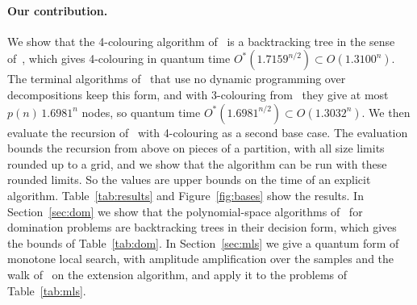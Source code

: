 \documentclass[11pt]{article}
\theoremstyle{remark}
\begin{document}
\paragraph{Our contribution.} We show that the 4-colouring algorithm of~\cite{WGJ24} is a backtracking tree in the sense of~\cite{Mon18}, which gives 4-colouring in quantum time $O^*(1.7159^{n/2}) \subset O(1.3100^n)$. The terminal algorithms of~\cite{YS26} that use no dynamic programming over decompositions keep this form, and with 3-colouring from~\cite{BE05} they give at most $p(n)\,1.6981^n$ nodes, so quantum time $O^*(1.6981^{n/2}) \subset O(1.3032^n)$. We then evaluate the recursion of~\cite{SM22} with 4-colouring as a second base case. The evaluation bounds the recursion from above on pieces of a partition, with all size limits rounded up to a grid, and we show that the algorithm can be run with these rounded limits. So the values are upper bounds on the time of an explicit algorithm. Table~\ref{tab:results} and Figure~\ref{fig:bases} show the results. In Section~\ref{sec:dom} we show that the polynomial-space algorithms of~\cite{RB11,RB12,BEP10} for domination problems are backtracking trees in their decision form, which gives the bounds of Table~\ref{tab:dom}. In Section~\ref{sec:mls} we give a quantum form of monotone local search, with amplitude amplification over the samples and the walk of~\cite{Mon18} on the extension algorithm, and apply it to the problems of Table~\ref{tab:mls}.
\end{document}
